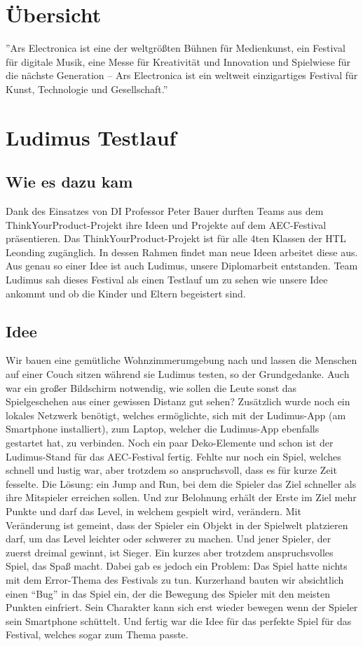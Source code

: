 \section{Übersicht}
''Ars Electronica ist eine der weltgrößten Bühnen für Medienkunst, ein Festival für digitale Musik, eine Messe für Kreativität und Innovation und Spielwiese für die nächste Generation – Ars Electronica ist ein weltweit einzigartiges Festival für Kunst, Technologie und Gesellschaft.'' \cite{noauthor_ars_nodate}
\section{Ludimus Testlauf}
\subsection{Wie es dazu kam}
Dank des Einsatzes von DI Professor Peter Bauer durften Teams aus dem ThinkYourProduct-Projekt ihre Ideen und Projekte auf dem AEC-Festival präsentieren. Das ThinkYourProduct-Projekt ist für alle 4ten Klassen der HTL Leonding zugänglich. In dessen Rahmen findet man neue Ideen arbeitet diese aus. Aus genau so einer Idee ist auch Ludimus, unsere Diplomarbeit entstanden. Team Ludimus sah dieses Festival als einen Testlauf um zu sehen wie unsere Idee ankommt und ob die Kinder und Eltern begeistert sind.
\subsection{Idee}\label{aecerror}
Wir bauen eine gemütliche Wohnzimmerumgebung nach und lassen die Menschen auf einer Couch sitzen während sie Ludimus testen, so der Grundgedanke. Auch war ein großer Bildschirm notwendig, wie sollen die Leute sonst das Spielgeschehen aus einer gewissen Distanz gut sehen? Zusätzlich wurde noch ein lokales Netzwerk benötigt, welches ermöglichte, sich mit der Ludimus-App (am Smartphone installiert), zum Laptop, welcher die Ludimus-App ebenfalls gestartet hat, zu verbinden. Noch ein paar Deko-Elemente und schon ist der Ludimus-Stand für das AEC-Festival fertig. Fehlte nur noch ein Spiel, welches schnell und lustig war, aber trotzdem so anspruchsvoll, dass es für kurze Zeit fesselte. Die Lösung: ein Jump and Run, bei dem die Spieler das Ziel schneller als ihre Mitspieler erreichen sollen. Und zur Belohnung erhält der Erste im Ziel mehr Punkte und darf das Level, in welchem gespielt wird, verändern. Mit Veränderung ist gemeint, dass der Spieler ein Objekt in der Spielwelt platzieren darf, um das Level leichter oder schwerer zu machen. Und jener Spieler, der zuerst dreimal gewinnt, ist Sieger. Ein kurzes aber trotzdem anspruchsvolles Spiel, das Spaß macht. Dabei gab es jedoch ein Problem: Das Spiel hatte nichts mit dem Error-Thema des Festivals zu tun. Kurzerhand bauten wir absichtlich einen “Bug” in das Spiel ein, der die Bewegung des Spieler mit den meisten Punkten einfriert. Sein Charakter kann sich erst wieder bewegen wenn der Spieler sein Smartphone schüttelt. Und fertig war die Idee für das perfekte Spiel für das Festival, welches sogar zum Thema passte.
